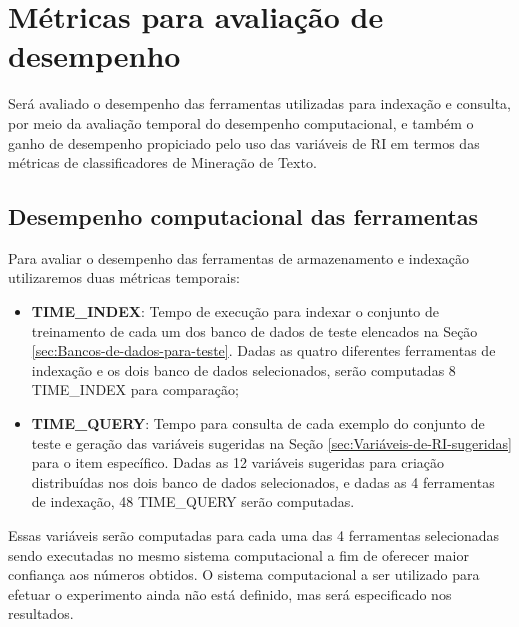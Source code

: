 \section{Métricas para avaliação de desempenho}  \label{sec:Métricas-para-avaliação-de-desempenho}
    Será avaliado o desempenho das ferramentas utilizadas para indexação e consulta, por meio da avaliação temporal do desempenho computacional, e também o ganho de desempenho propiciado pelo uso das variáveis de RI em termos das métricas de classificadores de Mineração de Texto. %
    
    \subsection{Desempenho computacional das ferramentas}  \label{subsec:Desempenho-computacional}
        Para avaliar o desempenho das ferramentas de armazenamento e indexação utilizaremos duas métricas temporais:
        \begin{itemize}
            \item \textbf{TIME\_INDEX}: Tempo de execução para indexar o conjunto de treinamento de cada um dos banco de dados de teste elencados na Seção \ref{sec:Bancos-de-dados-para-teste}. Dadas as quatro diferentes ferramentas de indexação e os dois banco de dados selecionados, serão computadas 8 TIME\_INDEX para comparação;
            
            \item \textbf{TIME\_QUERY}: Tempo para consulta de cada exemplo do conjunto de teste e geração das variáveis sugeridas na Seção \ref{sec:Variáveis-de-RI-sugeridas} para o item específico. Dadas as 12 variáveis sugeridas para criação distribuídas nos dois banco de dados selecionados, e dadas as 4 ferramentas de indexação, 48 TIME\_QUERY serão computadas.  
        \end{itemize}
        
        Essas variáveis serão computadas para cada uma das 4 ferramentas selecionadas sendo executadas no mesmo sistema computacional a fim de oferecer maior confiança aos números obtidos. 
        O sistema computacional a ser utilizado para efetuar o experimento ainda não está definido, mas será especificado nos resultados.
    

